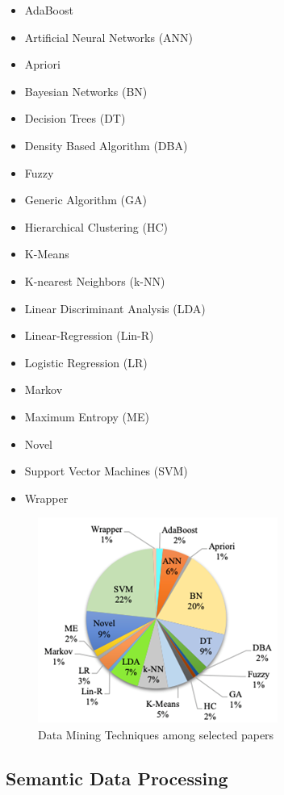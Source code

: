 \documentclass[runningheads]{llncs}
\begin{document}
\begin{itemize}
	\item AdaBoost
	\item Artificial Neural Networks (ANN)
	\item Apriori
	\item Bayesian Networks (BN)
	\item Decision Trees (DT)
	\item Density Based Algorithm (DBA)
	\item Fuzzy
	\item Generic Algorithm (GA)
	\item Hierarchical Clustering (HC) 
	\item K-Means
	\item K-nearest Neighbors (k-NN)
	\item Linear Discriminant Analysis (LDA)
	\item Linear-Regression (Lin-R)
	\item Logistic Regression (LR)
	\item Markov
	\item Maximum Entropy (ME)
	\item Novel
	\item Support Vector Machines (SVM)
	\item Wrapper
\end{itemize}

\begin{figure}[htb]
	\centering
	\includegraphics[width=.6\textwidth]{images/Picture1.png}
	\caption{Data Mining Techniques among selected papers}
	\label{fig:figure1}
\end{figure}


\subsection{Semantic Data Processing}
\end{document}
